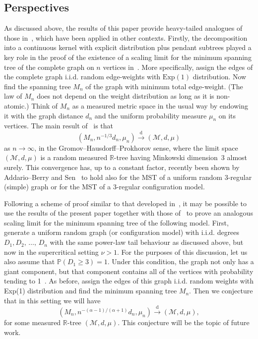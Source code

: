 \documentclass[10pt]{amsart}
\theoremstyle{definition}\newtheorem{defi}[theo]{Definition}\newtheorem{rema}[theo]{Remark}\newtheorem{exam}[theo]{Example}\newtheorem{exem}[theo]{Example}\newtheorem{nota}[theo]{Notation}
\newcommand{\Prob}[1]{\ensuremath{\mathbb{P} \left(#1 \right)}}
\newcommand{\convdist}{\ensuremath{\overset{\mathrm{d}}{\rightarrow}}}
\newcommand{\cM}{\mathcal{M}}
\newcommand{\R}{\mathbb{R}}
\begin{document}
\subsection{Perspectives}
As discussed above, the results of this paper provide heavy-tailed analogues of those in~\cite{ABBrGo}, which have been applied in other contexts. Firstly, the decomposition into a continuous kernel with explicit distribution plus pendant subtrees played a key role in the proof of the existence of a scaling limit for the minimum spanning tree of the complete graph on $n$ vertices in~\cite{ABBrGoMi}. More specifically, assign the edges of the complete graph i.i.d. random edge-weights with $\mathrm{Exp}(1)$ distribution. Now find the spanning tree $M_n$ of the graph with minimum total edge-weight. (The law of $M_n$ does not depend on the weight distribution as long as it is non-atomic.) Think of $M_n$ as a measured metric space in the usual way by endowing it with the graph distance $d_n$ and the uniform probability measure $\mu_n$ on its vertices. The main result of~\cite{ABBrGoMi} is that
\[
\left(M_n, n^{-1/3} d_n, \mu_n\right) \convdist \left(\cM, d, \mu\right)
\]
as $n \to \infty$, in the Gromov--Hausdorff--Prokhorov sense, where the limit space $(\cM,d,\mu)$ is a random measured $\R$-tree having Minkowski dimension~3 almost surely. This convergence has, up to a constant factor, recently been shown by Addario--Berry and Sen~\cite{ABSen} to hold also for the MST of a uniform random 3-regular (simple) graph or for the MST of a 3-regular configuration model.

Following a scheme of proof similar to that developed in~\cite{ABBrGoMi}, it may be possible to use the results of the present paper together with those of~\cite{CKG17+} to prove an analogous scaling limit for the minimum spanning tree of the following model. First, generate a uniform random graph (or configuration model) with i.i.d. degrees $D_1, D_2,\, \ldots,\,D_n$ with the same power-law tail behaviour as discussed above, but now in the supercritical setting $\nu > 1$. For the purposes of this discussion, let us also assume that $\Prob{D_1 \ge 3} = 1$. Under this condition, the graph not only has a giant component, but that component contains all of the vertices with probability tending to 1~\cite[Lemma~1.2]{ChatterjeeDurrett}. As before, assign the edges of this graph i.i.d. random weights with Exp(1) distribution and find the minimum spanning tree $M_n$. Then we conjecture that in this setting we will have
\[
\left(M_n, n^{-(\alpha-1)/(\alpha+1)} d_n, \mu_n\right) \convdist \left(\cM, d, \mu\right),
\]
for some measured $\R$-tree $(\cM,d,\mu)$. This conjecture will be the topic of future work.
\end{document}
